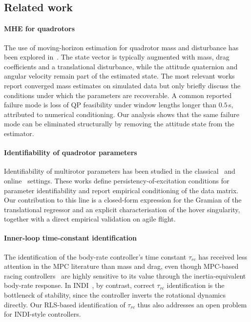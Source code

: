 \documentclass[lettersize,journal]{IEEEtran}
\begin{document}
\subsection{Related work}\label{sec:related}
\paragraph*{MHE for quadrotors}
The use of moving-horizon estimation for quadrotor mass and
disturbance has been explored
in~\cite{torrente2021data,nguyen2020model,liu2023nonlinear,kabzan2019learning}.
The state vector is typically augmented with mass, drag
coefficients and a translational disturbance, while the attitude
quaternion and angular velocity remain part of the estimated
state.  The most relevant
works~\cite{liu2023nonlinear,kabzan2019learning} report converged
mass estimates on simulated data but only briefly discuss the
conditions under which the parameters are recoverable.  A common
reported failure mode is loss of QP feasibility under window
lengths longer than $0.5$\,s, attributed to numerical
conditioning.  Our analysis shows that the same failure mode can
be eliminated structurally by removing the attitude state from
the estimator.

\paragraph*{Identifiability of quadrotor parameters}
Identifiability of multirotor parameters has been studied in the
classical~\cite{burri2018system} and online~\cite{wuest2019online}
settings.  These works define persistency-of-excitation conditions
for parameter identifiability and report empirical conditioning of
the data matrix.  Our contribution to this line is a closed-form
expression for the Gramian of the translational regressor and an
explicit characterisation of the hover singularity, together with
a direct empirical validation on agile flight.

\paragraph*{Inner-loop time-constant identification}
The identification of the body-rate controller's time constant
$\tau_{rc}$ has received less attention in the MPC literature
than mass and drag, even though MPC-based racing
controllers~\cite{romero2022model,foehn2021time} are highly
sensitive to its value through the inertia-equivalent body-rate
response.  In INDI~\cite{smeur2016adaptive,sun2022comparative},
by contrast, correct $\tau_{rc}$ identification is the bottleneck
of stability, since the controller inverts the rotational
dynamics directly.  Our RLS-based identification of $\tau_{rc}$
thus also addresses an open problem for INDI-style controllers.
\end{document}
